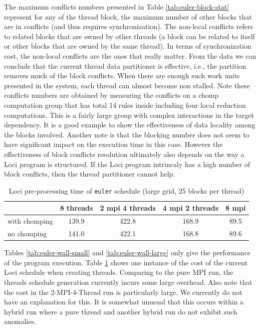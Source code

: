 \documentclass{article}
\begin{document}
The maximum conflicts numbers presented in Table
\ref{tab:euler-block-stat} represent for any of the thread block,
the maximum number of other blocks that are in conflicts (and thus
requires synchronization).  The non-local conflicts refers to related
blocks that are owned by other threads (a block can be related
to itself or other blocks that are owned by the same thread).  In
terms of synchronization cost, the non-local conflicts are the ones that
really matter.  From the data we can conclude that the current thread
data partitioner is effective, i.e., the partition removes much of the
block conflicts.  When there are enough such work units presented
in the system, each thread can almost become non stalled.  Note these
conflicts numbers are obtained by measuring the conflicts on a chomp
computation group that has total 14 rules inside including four local
reduction computations.  This is a fairly large group with complex
interactions in the target dependency.  It is a good example to show the
effectiveness of data locality among the blocks involved.  Another
note is that the blocking number does not seem to have significant
impact on the execution time in this case.  However the effectiveness of
block conflicts resolution ultimately also depends on the way a Loci
program is structured.  If the Loci program intrincaly has a high number
of block conflicts, then the thread partitioner cannot help.

\begin{table}[h]
  \begin{center}
    \caption{Loci pre-processing time of \texttt{euler} schedule (large grid, 25 blocks per thread)\label{tab:euler-sched-large}}
    \begin{tabular}{|l|c|c|c|c|}
      \hline
      & 8 threads & 2 mpi 4 threads & 4 mpi 2 threads & 8 mpi\\
      \hline
      with chomping & 139.9 & 422.8 & 168.9 & 89.5\\ 
      no chomping & 141.0 & 422.1 & 168.8 & 89.6\\
      \hline
    \end{tabular}
  \end{center}
\end{table}
Tables \ref{tab:euler-wall-small} and \ref{tab:euler-wall-large} only
give the performance of the program execution.  Table
\ref{tab:euler-sched-large} shows one instance of the cost of the current
Loci schedule when creating threads.  Comparing to the pure MPI run, the
threads schedule generation currently incurs some large overhead.  Also
note that the cost in the 2-MPI-4-Thread run is particularly large.  We
currently do not have an explanation for this.  It is somewhat unusual
that this occurs within a hybrid run where a pure thread and another
hybrid run do not exhibit such anomalies.
\end{document}
